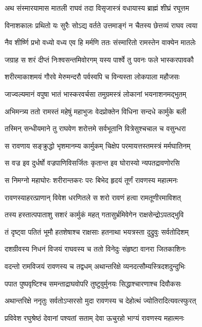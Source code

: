 \twolineshloka
{अथ संस्मारयामास मातली राघवं तदा}
{विसृजास्त्रं वधायास्य ब्राह्मं शीघ्रं रघूत्तम} %

\twolineshloka
{विनाशकालः प्रथितो यः सुरैः सोऽद्य वर्तते}
{उत्तमाङ्गं न चैतस्य छेत्तव्यं राघव त्वया} %

\twolineshloka
{नैव शीर्ष्णि प्रभो वध्यो वध्य एव हि मर्मणि}
{ततः संस्मारितो रामस्तेन वाक्येन मातलेः} %

\twolineshloka
{जग्राह स शरं दीप्तं निःश्वसन्तमिवोरगम्}
{यस्य पार्श्वे तु पवनः फले भास्करपावकौ} %

\twolineshloka
{शरीरमाकाशमयं गौरवे मेरुमन्दरौ}
{पर्वस्वपि च विन्यस्ता लोकपाला महौजसः} %

\twolineshloka
{जाज्वल्यमानं वपुषा भातं भास्करवर्चसा}
{तमुग्रमस्त्रं लोकानां भयनाशनमद्भुतम्} %

\twolineshloka
{अभिमन्त्र्य ततो रामस्तं महेषुं महाभुजः}
{वेदप्रोक्तेन विधिना सन्दधे कार्मुके बली} %

\twolineshloka
{तस्मिन् सन्धीयमाने तु राघवेण शरोत्तमे}
{सर्वभूतानि वित्रेसुश्चचाल च वसुन्धरा} %

\twolineshloka
{स रावणाय सङ्क्रुद्धो भृशमानम्य कार्मुकम्}
{चिक्षेप परमायत्तस्तमस्त्रं मर्मघातिनम्} %

\twolineshloka
{स वज्र इव दुर्धर्षो वज्रपाणिविसर्जितः}
{कृतान्त इव घोरास्यो न्यपतद्रावणोरसि} %

\twolineshloka
{स निमग्नो महाघोरः शरीरान्तकरः परः}
{बिभेद हृदयं तूर्णं रावणस्य महात्मनः} %

\twolineshloka
{रावणस्याहरत्प्राणान् विवेश धरणितले}
{स शरो रावणं हत्वा रामतूणीरमाविशत्} %

\twolineshloka
{तस्य हस्तात्पपाताशु सशरं कार्मुकं महत्}
{गतासुर्भ्रमिवेगेन राक्षसेन्द्रोऽपतद्भुवि} %

\twolineshloka
{तं दृष्ट्वा पतितं भूमौ हतशेषाश्च राक्षसाः}
{हतनाथा भयत्रस्ता दुद्रुवुः सर्वतोदिशम्} %

\twolineshloka
{दशग्रीवस्य निधनं विजयं राघवस्य च}
{ततो विनेदुः संहृष्टा वानरा जितकाशिनः} %

\twolineshloka
{वदन्तो रामविजयं रावणस्य च तद्वधम्}
{अथान्तरिक्षे व्यनदत्सौम्यस्त्रिदशदुन्दुभिः} %

\twolineshloka
{पपात पुष्पवृष्टिश्च समन्ताद्राघवोपरि}
{तुष्टुवुर्मुनयः सिद्धाश्चारणाश्च दिवौकसः} %

\twolineshloka
{अथान्तरिक्षे ननृतुः सर्वतोऽप्सरसो मुदा}
{रावणस्य च देहोत्थं ज्योतिरादित्यवत्स्फुरत्} %

\twolineshloka
{प्रविवेश रघुश्रेष्ठं देवानां पश्यतां सताम्}
{देवा ऊचुरहो भाग्यं रावणस्य महात्मनः} %

